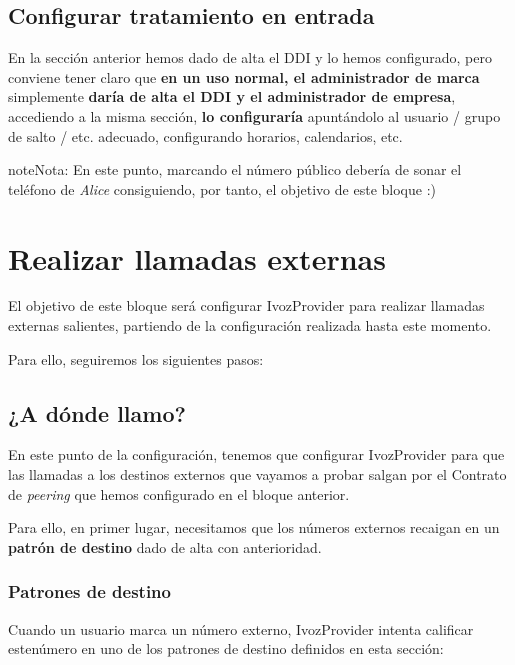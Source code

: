 \documentclass[letterpaper,10pt,spanish]{sphinxmanual}
\begin{document}
\section{Configurar tratamiento en entrada}
\label{external_incoming_calls/configure_ddi:configure-incoming-routes}
En la sección anterior hemos dado de alta el DDI y lo hemos configurado, pero conviene tener claro que \textbf{en un uso normal, el administrador de marca} simplemente \textbf{daría de alta el DDI y el administrador de empresa}, accediendo a la misma sección, \textbf{lo configuraría} apuntándolo al usuario / grupo de salto / etc. adecuado, configurando horarios, calendarios, etc.

\begin{notice}{note}{Nota:}
En este punto, marcando el número público debería de sonar el teléfono de \emph{Alice} consiguiendo, por tanto, el objetivo de este bloque :)
\end{notice}


\chapter{Realizar llamadas externas}
\label{external_outgoing_calls/index:making-external-calls}\label{external_outgoing_calls/index::doc}
El objetivo de este bloque será configurar IvozProvider para realizar llamadas externas salientes, partiendo de la configuración realizada hasta este momento.

Para ello, seguiremos los siguientes pasos:


\section{¿A dónde llamo?}
\label{external_outgoing_calls/call_types::doc}\label{external_outgoing_calls/call_types:where-do-i-call}
En este punto de la configuración, tenemos que configurar IvozProvider para que las llamadas a los destinos externos que vayamos a probar salgan por el Contrato de \emph{peering} que hemos configurado en el bloque anterior.

Para ello, en primer lugar, necesitamos que los números externos recaigan en un \textbf{patrón de destino} dado de alta con anterioridad.


\subsection{Patrones de destino}
\label{external_outgoing_calls/call_types:target-patterns}\label{external_outgoing_calls/call_types:id1}
Cuando un usuario marca un número externo, IvozProvider intenta calificar  estenúmero en uno de los patrones de destino definidos en esta sección:
\end{document}
